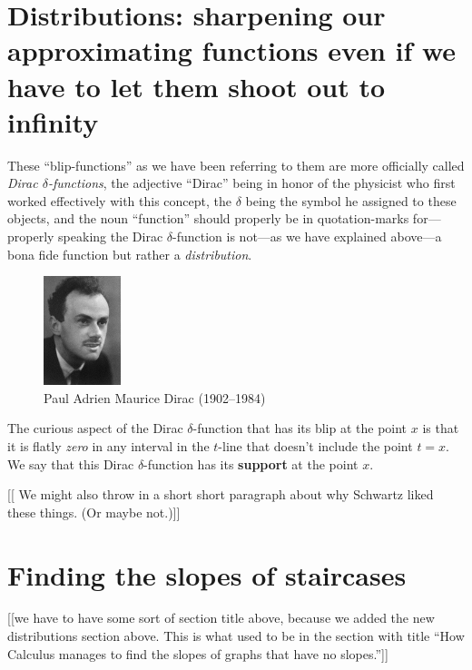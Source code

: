 \documentclass[11pt]{article}
\theoremstyle{plain}
\theoremstyle{definition}
\numberwithin{equation}{section}
\numberwithin{figure}{section}
\numberwithin{table}{section}
\begin{document}
\section{Distributions: sharpening our approximating functions even if
  we have to let them shoot out to infinity}
These ``blip-functions'' as we have been referring to them are more
officially called {\em Dirac $\delta$-functions}, the adjective
``Dirac'' being in honor of the physicist who first worked effectively
with this concept, the $\delta$ being the symbol he assigned to these
objects, and the noun ``function'' should properly be in
quotation-marks for---properly speaking the Dirac $\delta$-function is
not---as we have explained above---a bona fide function but rather a
{\em distribution}.

\begin{figure}
\begin{center}
\includegraphics[width=0.2\textwidth]{illustrations/dirac}
\caption{Paul Adrien Maurice Dirac (1902--1984)}
\end{center}
\end{figure}

   The curious aspect of the Dirac $\delta$-function that has its blip
   at the point $x$ is that it is flatly {\em zero} in any interval in
   the $t$-line that doesn't include the point $t=x$.  We say that
   this Dirac $\delta$-function has its {\bf support} at the point $x$.

[[ We might also throw in a short short paragraph about why Schwartz liked these things. (Or maybe not.)]]

\section{Finding the slopes of staircases} 

[[we have to have some sort of section title above, because we added
the new distributions section above.  This is what used to be in the
section with title ``How Calculus manages to find the slopes of graphs
that have no slopes.'']]
\end{document}
